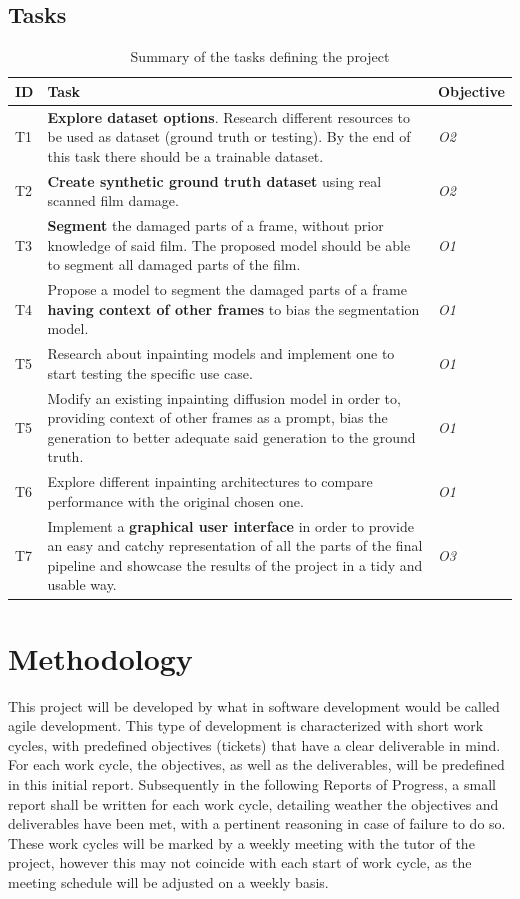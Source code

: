 \documentclass[openany, 12pt]{article}
\begin{document}
	\subsection{Tasks}
	\setlength{\arrayrulewidth}{.7 pt}
	\begin{table}[ht]
		\small
		\centering
		\begin{tabular}{|I|O|M|}
			\hline
			\textbf{ID} & \textbf{Task} & \textbf{Objective}\\ \hline
			T1 & \textbf{Explore dataset options}. Research different resources to be used as dataset (ground truth or testing). By the end of this task there should be a trainable dataset. & \textit{O2} \\ \hline
			T2 & \textbf{Create synthetic ground truth dataset} using real scanned film damage. &\textit{O2} \\ \hline 
			T3 & \textbf{Segment} the damaged parts of a frame, without prior knowledge of said film. The proposed model should be able to segment all damaged parts of the film. & \textit{O1}\\ \hline
			T4 & Propose a model to segment the damaged parts of a frame \textbf{having context of other frames} to bias the segmentation model. & \textit{O1} \\ \hline
			T5 & Research about inpainting models and implement one to start testing the specific use case. & \textit{O1} \\ \hline
			T5 & Modify an existing inpainting diffusion model in order to, providing context of other frames as a prompt, bias the generation to better adequate said generation to the ground truth.  & \textit{O1} \\ \hline
			T6 & Explore different inpainting architectures to compare performance with the original chosen one.  & \textit{O1} \\ \hline
			T7 & Implement a \textbf{graphical user interface} in order to provide an easy and catchy representation of all the parts of the final pipeline and showcase the results of the project in a tidy and usable way.  & \textit{O3}\\ \hline
		\end{tabular}
		\caption{Summary of the tasks defining the project}
	\end{table}
	\newpage
	\section{Methodology}
	{\color{blue}
	This project will be developed by what in software development would be called agile development. This type of development is characterized with short work cycles, with predefined objectives (tickets) that have a clear deliverable in mind. For each work cycle, the objectives, as well as the deliverables, will be predefined in this initial report. Subsequently in the following Reports of Progress, a small report shall be written for each work cycle, detailing weather the objectives and deliverables have been met, with a pertinent reasoning in case of failure to do so. 
	These work cycles will be marked by a weekly meeting with the tutor of the project, however this may not coincide with each start of work cycle, as the meeting schedule will be adjusted on a weekly basis.}
\end{document}
